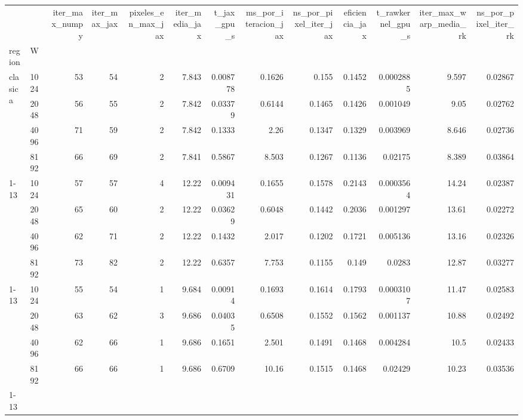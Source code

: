 \begin{tabular}{llrrrrrrrrrrr}
\toprule
 &  & iter_max_numpy & iter_max_jax & pixeles_en_max_jax & iter_media_jax & t_jax_gpu_s & ms_por_iteracion_jax & ns_por_pixel_iter_jax & eficiencia_jax & t_rawkernel_gpu_s & iter_max_warp_media_rk & ns_por_pixel_iter_rk \\
region & W &  &  &  &  &  &  &  &  &  &  &  \\
\midrule
\multirow[t]{4}{*}{clasica} & 1024 & 53 & 54 & 2 & 7.843 & 0.008778 & 0.1626 & 0.155 & 0.1452 & 0.0002885 & 9.597 & 0.02867 \\
 & 2048 & 56 & 55 & 2 & 7.842 & 0.03379 & 0.6144 & 0.1465 & 0.1426 & 0.001049 & 9.05 & 0.02762 \\
 & 4096 & 71 & 59 & 2 & 7.842 & 0.1333 & 2.26 & 0.1347 & 0.1329 & 0.003969 & 8.646 & 0.02736 \\
 & 8192 & 66 & 69 & 2 & 7.841 & 0.5867 & 8.503 & 0.1267 & 0.1136 & 0.02175 & 8.389 & 0.03864 \\
\cline{1-13}
\multirow[t]{4}{*}{frontera_central} & 1024 & 57 & 57 & 4 & 12.22 & 0.009431 & 0.1655 & 0.1578 & 0.2143 & 0.0003564 & 14.24 & 0.02387 \\
 & 2048 & 65 & 60 & 2 & 12.22 & 0.03629 & 0.6048 & 0.1442 & 0.2036 & 0.001297 & 13.61 & 0.02272 \\
 & 4096 & 62 & 71 & 2 & 12.22 & 0.1432 & 2.017 & 0.1202 & 0.1721 & 0.005136 & 13.16 & 0.02326 \\
 & 8192 & 73 & 82 & 2 & 12.22 & 0.6357 & 7.753 & 0.1155 & 0.149 & 0.0283 & 12.87 & 0.03277 \\
\cline{1-13}
\multirow[t]{4}{*}{frontera_lateral} & 1024 & 55 & 54 & 1 & 9.684 & 0.00914 & 0.1693 & 0.1614 & 0.1793 & 0.0003107 & 11.47 & 0.02583 \\
 & 2048 & 63 & 62 & 3 & 9.686 & 0.04035 & 0.6508 & 0.1552 & 0.1562 & 0.001137 & 10.88 & 0.02492 \\
 & 4096 & 62 & 66 & 1 & 9.686 & 0.1651 & 2.501 & 0.1491 & 0.1468 & 0.004284 & 10.5 & 0.02433 \\
 & 8192 & 66 & 66 & 1 & 9.686 & 0.6709 & 10.16 & 0.1515 & 0.1468 & 0.02429 & 10.23 & 0.03536 \\
\cline{1-13}
\bottomrule
\end{tabular}
